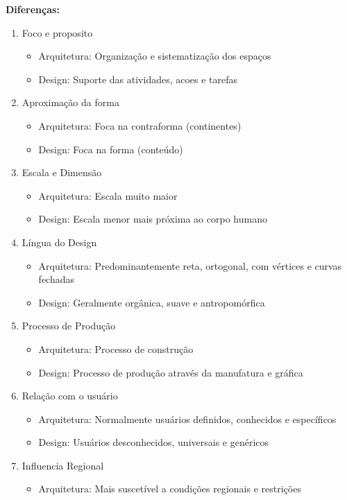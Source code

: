 \documentclass{article}
\begin{document}
\textbf{Diferenças:}
\begin{enumerate}
    \item Foco e proposito
    \begin{itemize}
        \item Arquitetura: Organização e sistematização dos espaços
        \item Design: Suporte das atividades, acoes e tarefas
    \end{itemize}
    \item Aproximação da forma
    \begin{itemize}
        \item Arquitetura: Foca na contraforma (continentes)
        \item Design: Foca na forma (conteúdo)
    \end{itemize}
    \item Escala e Dimensão
    \begin{itemize}
        \item Arquitetura: Escala muito maior
        \item Design: Escala menor mais próxima ao corpo humano
    \end{itemize}
    \item Língua do Design
    \begin{itemize}
        \item Arquitetura: Predominantemente reta, ortogonal, com vértices e curvas fechadas
        \item Design: Geralmente orgânica, suave e antropomórfica
    \end{itemize}
    \item Processo de Produção
    \begin{itemize}
        \item Arquitetura: Processo de construção
        \item Design: Processo de produção através da manufatura e gráfica
    \end{itemize}
    \item Relação com o usuário
    \begin{itemize}
        \item Arquitetura: Normalmente usuários definidos, conhecidos e específicos
        \item Design: Usuários desconhecidos, universais e genéricos
    \end{itemize}
    \item Influencia Regional
    \begin{itemize}
        \item Arquitetura: Mais suscetível a condições regionais e restrições

\end{itemize}
\end{enumerate}
\end{document}
